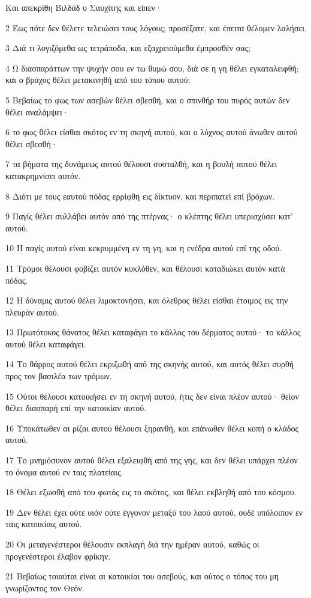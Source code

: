\par Και απεκρίθη Βιλδάδ ο Σαυχίτης και είπεν·
\par 2 Έως πότε δεν θέλετε τελειώσει τους λόγους; προσέξατε, και έπειτα θέλομεν λαλήσει.
\par 3 Διά τι λογιζόμεθα ως τετράποδα, και εξαχρειούμεθα έμπροσθέν σας;
\par 4 Ω διασπαράττων την ψυχήν σου εν τω θυμώ σου, διά σε η γη θέλει εγκαταλειφθή; και ο βράχος θέλει μετακινηθή από του τόπου αυτού;
\par 5 Βεβαίως το φως των ασεβών θέλει σβεσθή, και ο σπινθήρ του πυρός αυτών δεν θέλει αναλάμψει·
\par 6 το φως θέλει είσθαι σκότος εν τη σκηνή αυτού, και ο λύχνος αυτού άνωθεν αυτού θέλει σβεσθή·
\par 7 τα βήματα της δυνάμεως αυτού θέλουσι συσταλθή, και η βουλή αυτού θέλει κατακρημνίσει αυτόν.
\par 8 Διότι με τους εαυτού πόδας ερρίφθη εις δίκτυον, και περιπατεί επί βρόχων.
\par 9 Παγίς θέλει συλλάβει αυτόν από της πτέρνας· ο κλέπτης θέλει υπερισχύσει κατ' αυτού.
\par 10 Η παγίς αυτού είναι κεκρυμμένη εν τη γη, και η ενέδρα αυτού επί της οδού.
\par 11 Τρόμοι θέλουσι φοβίζει αυτόν κυκλόθεν, και θέλουσι καταδιώκει αυτόν κατά πόδας.
\par 12 Η δύναμις αυτού θέλει λιμοκτονήσει, και όλεθρος θέλει είσθαι έτοιμος εις την πλευράν αυτού.
\par 13 Πρωτότοκος θάνατος θέλει καταφάγει το κάλλος του δέρματος αυτού· το κάλλος αυτού θέλει καταφάγει.
\par 14 Το θάρρος αυτού θέλει εκριζωθή από της σκηνής αυτού, και αυτός θέλει συρθή προς τον βασιλέα των τρόμων.
\par 15 Ούτοι θέλουσι κατοικήσει εν τη σκηνή αυτού, ήτις δεν είναι πλέον αυτού· θείον θέλει διασπαρή επί την κατοικίαν αυτού.
\par 16 Υποκάτωθεν αι ρίζαι αυτού θέλουσι ξηρανθή, και επάνωθεν θέλει κοπή ο κλάδος αυτού.
\par 17 Το μνημόσυνον αυτού θέλει εξαλειφθή από της γης, και δεν θέλει υπάρχει πλέον το όνομα αυτού εν ταις πλατείαις.
\par 18 Θέλει εξωσθή από του φωτός εις το σκότος, και θέλει εκβληθή από του κόσμου.
\par 19 Δεν θέλει έχει ούτε υιόν ούτε έγγονον μεταξύ του λαού αυτού, ουδέ υπόλοιπον εν ταις κατοικίαις αυτού.
\par 20 Οι μεταγενέστεροι θέλουσιν εκπλαγή διά την ημέραν αυτού, καθώς οι προγενέστεροι έλαβον φρίκην.
\par 21 Βεβαίως τοιαύται είναι αι κατοικίαι του ασεβούς, και ούτος ο τόπος του μη γνωρίζοντος τον Θεόν.

